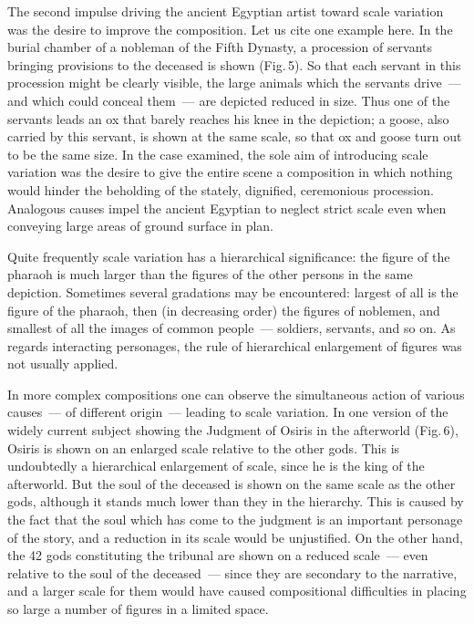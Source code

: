 

The second impulse driving the ancient Egyptian artist toward scale variation was the
desire to improve the composition. Let us cite one example here. In the burial chamber
of a nobleman of the Fifth Dynasty, a procession of servants bringing provisions to the
deceased is shown (Fig.\,5). So that each servant in this procession might be clearly
visible, the large animals which the servants drive~--- and which could conceal them~---
are depicted reduced in size. Thus one of the servants leads an ox that barely reaches
his knee in the depiction; a goose, also carried by this servant, is shown at the same
scale, so that ox and goose turn out to be the same size. In the case examined, the sole
aim of introducing scale variation was the desire to give the entire scene a composition
in which nothing would hinder the beholding of the stately, dignified, ceremonious
procession. Analogous causes impel the ancient Egyptian to neglect strict scale even
when conveying large areas of ground surface in plan.

Quite frequently scale variation has a hierarchical significance: the figure of the
pharaoh is much larger than the figures of the other persons in the same depiction.
Sometimes several gradations may be encountered: largest of all is the figure of the
pharaoh, then (in decreasing order) the figures of noblemen, and smallest of all the
images of common people~--- soldiers, servants, and so on. As regards interacting
personages, the rule of hierarchical enlargement of figures was not usually applied.


In more complex compositions one can observe the simultaneous action of various
causes~--- of different origin~--- leading to scale variation. In one version of the widely
current subject showing the Judgment of Osiris in the afterworld (Fig.\,6), Osiris is
shown on an enlarged scale relative to the other gods. This is undoubtedly a hierarchical
enlargement of scale, since he is the king of the afterworld. But the soul of the deceased
is shown on the same scale as the other gods, although it stands much lower than they
in the hierarchy. This is caused by the fact that the soul which has come to the judgment
is an important personage of the story, and a reduction in its scale would be unjustified.
On the other hand, the 42 gods constituting the tribunal are shown on a reduced scale~---
even relative to the soul of the deceased~--- since they are secondary to the narrative,
and a larger scale for them would have caused compositional difficulties in placing so
large a number of figures in a limited space.

